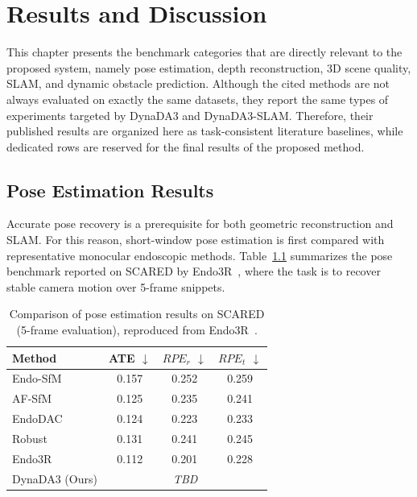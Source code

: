 \chapter{Results and Discussion}
\label{chap:results}

\providecommand{\tbd}{\textit{TBD}}

This chapter presents the benchmark categories that are directly relevant to the proposed system, namely pose estimation, depth reconstruction, 3D scene quality, SLAM, and dynamic obstacle prediction. Although the cited methods are not always evaluated on exactly the same datasets, they report the same types of experiments targeted by DynaDA3 and DynaDA3-SLAM. Therefore, their published results are organized here as task-consistent literature baselines, while dedicated rows are reserved for the final results of the proposed method.

\section{Pose Estimation Results}
Accurate pose recovery is a prerequisite for both geometric reconstruction and SLAM. For this reason, short-window pose estimation is first compared with representative monocular endoscopic methods. Table~\ref{tab:pose_scared} summarizes the pose benchmark reported on SCARED by Endo3R~\cite{endo3r2025}, where the task is to recover stable camera motion over 5-frame snippets.

\begin{table}[htbp]
    \centering
    \caption[Pose estimation results on SCARED]{Comparison of pose estimation results on SCARED (5-frame evaluation), reproduced from Endo3R~\cite{endo3r2025}.}
    \label{tab:pose_scared}
    \begin{tabular}{lccc}
        \toprule
        \textbf{Method} & \textbf{ATE $\downarrow$} & \textbf{$RPE_r$ $\downarrow$} & \textbf{$RPE_t$ $\downarrow$} \\
        \midrule
        Endo-SfM & 0.157 & 0.252 & 0.259 \\
        AF-SfM & 0.125 & 0.235 & 0.241 \\
        EndoDAC & 0.124 & 0.223 & 0.233 \\
        Robust & 0.131 & 0.241 & 0.245 \\
        Endo3R & 0.112 & 0.201 & 0.228 \\
        DynaDA3 (Ours) & \multicolumn{3}{c}{\tbd} \\
        \bottomrule
    \end{tabular}
\end{table}

